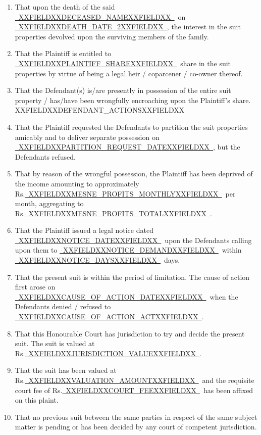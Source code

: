 \documentclass[12pt,a4paper]{article}
\newcommand{\fillline}[1]{\underline{~#1~}}
\begin{document}
\begin{enumerate}[leftmargin=*, label=\arabic{enumi}., itemsep=12pt, topsep=2pt]
  \item That upon the death of the said \fillline{XXFIELDXXDECEASED_NAMEXXFIELDXX}\ on
        \fillline{XXFIELDXXDEATH_DATE_2XXFIELDXX}, the interest in the suit properties devolved upon
        the surviving members of the family.

  \item That the Plaintiff is entitled to \fillline{XXFIELDXXPLAINTIFF_SHAREXXFIELDXX}\ share in the
        suit properties by virtue of being a legal heir / coparcener / co-owner thereof.

  \item That the Defendant(s) is/are presently in possession of the entire
        suit property / has/have been wrongfully encroaching upon the
        Plaintiff's share. XXFIELDXXDEFENDANT_ACTIONSXXFIELDXX

  \item That the Plaintiff requested the Defendants to partition the suit
        properties amicably and to deliver separate possession on \fillline{XXFIELDXXPARTITION_REQUEST_DATEXXFIELDXX},
        but the Defendants refused.

  \item That by reason of the wrongful possession, the Plaintiff has been deprived of
        the income amounting to approximately Rs.\fillline{XXFIELDXXMESNE_PROFITS_MONTHLYXXFIELDXX}\ per
        month, aggregating to Rs.\fillline{XXFIELDXXMESNE_PROFITS_TOTALXXFIELDXX}.

  \item That the Plaintiff issued a legal notice dated \fillline{XXFIELDXXNOTICE_DATEXXFIELDXX}\ upon
        the Defendants calling upon them to \fillline{XXFIELDXXNOTICE_DEMANDXXFIELDXX}\ within
        \fillline{XXFIELDXXNOTICE_DAYSXXFIELDXX}\ days.

  \item That the present suit is within the period of limitation. The cause
        of action first arose on \fillline{XXFIELDXXCAUSE_OF_ACTION_DATEXXFIELDXX}\ when the Defendants
        denied / refused to \fillline{XXFIELDXXCAUSE_OF_ACTION_ACTXXFIELDXX}.

  \item That this Honourable Court has jurisdiction to try and decide the
        present suit. The suit is valued at Rs.\fillline{XXFIELDXXJURISDICTION_VALUEXXFIELDXX}.

  \item That the suit has been valued at Rs.\fillline{XXFIELDXXVALUATION_AMOUNTXXFIELDXX}\ and the requisite court fee
        of Rs.\fillline{XXFIELDXXCOURT_FEEXXFIELDXX}\ has been affixed on this plaint.

  \item That no previous suit between the same parties in respect of the
        same subject matter is pending or has been decided by any court
        of competent jurisdiction.

\end{enumerate}
\end{document}
